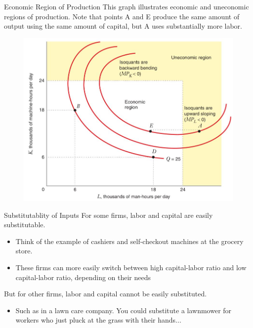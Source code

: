\documentclass[11pt,t]{beamer}
\begin{document}
\begin{frame}{Economic Region of Production}
  This graph illustrates economic and uneconomic regions of production. Note that points A and E produce the same amount of output using the same amount of capital, but A uses substantially more labor.

  \begin{figure}
    \includegraphics[width = 0.6\linewidth]{figures/fig6_9.jpg}
  \end{figure}
\end{frame}

\begin{frame}{Substitutablity of Inputs}
  For some firms, labor and capital are easily substitutable.
  
  \bigskip
  \begin{itemize}
    \item Think of the example of cashiers and self-checkout machines at the grocery store.

    \item These firms can more easily switch between high capital-labor ratio and low capital-labor ratio, depending on their needs
  \end{itemize}
  
  \pause\bigskip
  But for other firms, labor and capital cannot be easily substituted.

  \bigskip
  \begin{itemize}
    \item Such as in a lawn care company. You could substitute a lawnmower for workers who just pluck at the grass with their hands...
  \end{itemize}
\end{frame}
\end{document}
